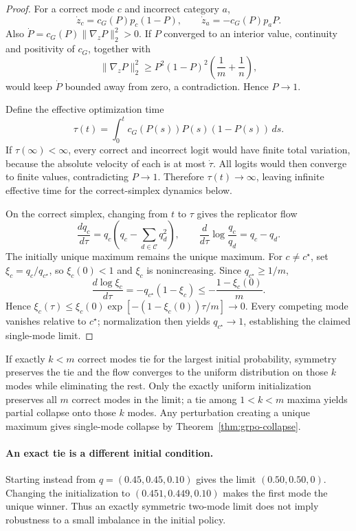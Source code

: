 \begin{proof}
For a correct mode $c$ and incorrect category $a$,
\[
  \dot z_c=c_G(P)p_c(1-P),
  \qquad
  \dot z_a=-c_G(P)p_aP.
\]
Also $\dot P=c_G(P)\lVert\nabla_zP\rVert_2^2>0$. If $P$ converged to an
interior value, continuity and positivity of $c_G$, together with
\[
 \lVert\nabla_zP\rVert_2^2
 \ge P^2(1-P)^2\left(\frac1m+\frac1n\right),
\]
would keep $\dot P$ bounded away from zero, a contradiction. Hence $P\to1$.

Define the effective optimization time
\[
  \tau(t)=\int_0^t c_G(P(s))P(s)(1-P(s))\,ds.
\]
If $\tau(\infty)<\infty$, every correct and incorrect logit would have finite
total variation, because the absolute velocity of each is at most $\dot\tau$.
All logits would then converge to finite values, contradicting $P\to1$.
Therefore $\tau(t)\to\infty$, leaving infinite effective time for the
correct-simplex dynamics below.

On the correct simplex, changing from $t$ to $\tau$ gives the replicator flow
\begin{equation}
  \frac{dq_c}{d\tau}
  =q_c\left(q_c-\sum_{d\in\mathcal C}q_d^2\right),
  \qquad
  \frac{d}{d\tau}\log\frac{q_c}{q_d}=q_c-q_d.
  \label{eq:grpo-replicator}
\end{equation}
The initially unique maximum remains the unique maximum. For $c\ne c^\star$,
set $\xi_c=q_c/q_{c^\star}$, so $\xi_c(0)<1$ and $\xi_c$ is nonincreasing.
Since $q_{c^\star}\ge1/m$,
\[
 \frac{d\log\xi_c}{d\tau}
 =-q_{c^\star}(1-\xi_c)
 \le-\frac{1-\xi_c(0)}{m}.
\]
Hence $\xi_c(\tau)\le\xi_c(0)\exp[-(1-\xi_c(0))\tau/m]\to0$.
Every competing mode vanishes relative to $c^\star$; normalization then
yields $q_{c^\star}\to1$, establishing the claimed single-mode limit.
\end{proof}

\begin{corollary}
\label{cor:grpo-ties}
If exactly $k<m$ correct modes tie for the largest initial probability, symmetry
preserves the tie and the flow converges to the uniform distribution on those
$k$ modes while eliminating the rest. Only the exactly uniform initialization preserves all $m$ correct modes
in the limit; a tie among $1<k<m$ maxima yields partial collapse onto those
$k$ modes. Any perturbation creating a unique maximum gives single-mode
collapse by Theorem~\ref{thm:grpo-collapse}.
\end{corollary}

\paragraph{An exact tie is a different initial condition.}
Starting instead from $q=(0.45,0.45,0.10)$ gives the limit
$(0.50,0.50,0)$. Changing the initialization to $(0.451,0.449,0.10)$ makes
the first mode the unique winner. Thus an exactly symmetric two-mode limit
does not imply robustness to a small imbalance in the initial policy.

